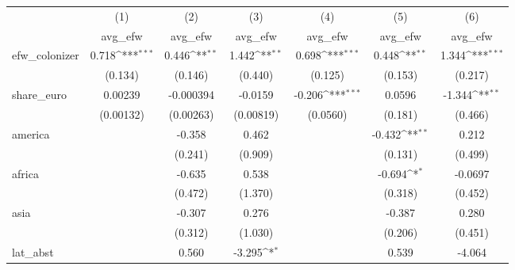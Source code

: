 {
\def\sym#1{\ifmmode^{#1}\else\(^{#1}\)\fi}
\begin{tabular}{l*{6}{c}}
\hline\hline
            &\multicolumn{1}{c}{(1)}&\multicolumn{1}{c}{(2)}&\multicolumn{1}{c}{(3)}&\multicolumn{1}{c}{(4)}&\multicolumn{1}{c}{(5)}&\multicolumn{1}{c}{(6)}\\
            &\multicolumn{1}{c}{avg\_efw}&\multicolumn{1}{c}{avg\_efw}&\multicolumn{1}{c}{avg\_efw}&\multicolumn{1}{c}{avg\_efw}&\multicolumn{1}{c}{avg\_efw}&\multicolumn{1}{c}{avg\_efw}\\
\hline
efw\_colonizer&       0.718\sym{***}&       0.446\sym{**} &       1.442\sym{**} &       0.698\sym{***}&       0.448\sym{**} &       1.344\sym{***}\\
            &     (0.134)         &     (0.146)         &     (0.440)         &     (0.125)         &     (0.153)         &     (0.217)         \\
[1em]
share\_euro  &     0.00239         &   -0.000394         &     -0.0159         &      -0.206\sym{***}&      0.0596         &      -1.344\sym{**} \\
            &   (0.00132)         &   (0.00263)         &   (0.00819)         &    (0.0560)         &     (0.181)         &     (0.466)         \\
[1em]
america     &                     &      -0.358         &       0.462         &                     &      -0.432\sym{**} &       0.212         \\
            &                     &     (0.241)         &     (0.909)         &                     &     (0.131)         &     (0.499)         \\
[1em]
africa      &                     &      -0.635         &       0.538         &                     &      -0.694\sym{*}  &     -0.0697         \\
            &                     &     (0.472)         &     (1.370)         &                     &     (0.318)         &     (0.452)         \\
[1em]
asia        &                     &      -0.307         &       0.276         &                     &      -0.387         &       0.280         \\
            &                     &     (0.312)         &     (1.030)         &                     &     (0.206)         &     (0.451)         \\
[1em]
lat\_abst    &                     &       0.560         &      -3.295\sym{*}  &                     &       0.539         &      -4.064         \\

\end{tabular}}
